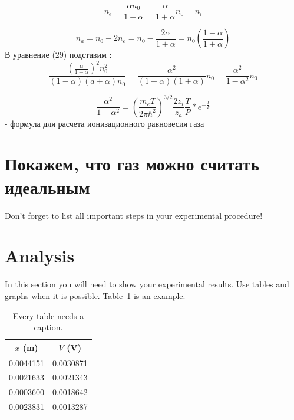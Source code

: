 \documentclass[letterpaper,12pt]{article}
\begin{document}
\begin{equation} \label{eq:aperp} %
n_e = \frac{\alpha n_0}{1+ \alpha} = \frac{\alpha}{1+\alpha}n_0=n_i
\end{equation}

\begin{equation} \label{eq:aperp} %
n_a = n_0 - 2n_e = n_0 - \frac{2 \alpha}{1+ \alpha}=n_0(\frac{1 - \alpha}{1 + \alpha })
\end{equation}
В уравнение (29) подставим :
\begin{equation} \label{eq:aperp} %
\frac{(\frac{\alpha}{1+\alpha})^2n_0^2}{(1-\alpha)(a+\alpha)n_0}=\frac{\alpha^2}{(1-\alpha)(1+\alpha)}n_0=\frac{\alpha^2}{1-\alpha^2}n_0
\end{equation}

\begin{equation} \label{eq:aperp} %
\frac{\alpha^2}{1-\alpha^2}=(\frac{m_e T}{2 \pi \hbar^2})^{3/2}\frac{2 z_i}{z_a}\frac{T}{P}*e^{-\frac{I}{T}}
\end{equation}
- формула для расчета ионизационного равновесия газа
\section{Покажем, что газ можно считать идеальным}


Don't forget to list all important steps in your experimental procedure!



\section{Analysis}

In this section you will need to show your experimental results. Use tables and
graphs when it is possible. Table~\ref{tbl:bins} is an example.

\begin{table}[ht]
\begin{center}
\caption{Every table needs a caption.}
\label{tbl:bins} %
\begin{tabular}{|cc|} 
\hline
\multicolumn{1}{|c}{$x$ (m)} & \multicolumn{1}{c|}{$V$ (V)} \\
\hline
0.0044151 &   0.0030871 \\
0.0021633 &   0.0021343 \\
0.0003600 &   0.0018642 \\
0.0023831 &   0.0013287 \\
\hline
\end{tabular}
\end{center}
\end{table}
\end{document}
